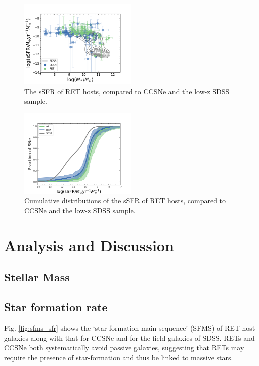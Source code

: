 \documentclass[fleqn,usenatbib,]{mnras}
\begin{document}
\begin{figure}
\includegraphics[width=0.5\textwidth]{figs/sSFR_Mike.png}
\caption{The sSFR of RET hosts, compared to CCSNe and the low-z SDSS sample.
\label{fig:sfms_ssfr}}
\end{figure}

\begin{figure}
\includegraphics[width=0.5\textwidth]{figs/cum_sSFR_mike.png}
\caption{Cumulative distributions of the sSFR of RET hosts, compared to CCSNe and the low-z SDSS sample.
\label{fig:ssfr_cum}}
\end{figure}


\section{Analysis and Discussion}
\label{sec:analysis} %



\subsection{Stellar Mass \label{subsec:res_mass}}

\subsection{Star formation rate \label{subsec:res_sfr}}
Fig. \ref{fig:sfms_sfr} shows the `star formation main sequence' (SFMS) of RET host galaxies along with that for CCSNe and for the field galaxies of SDSS. RETs and CCSNe both systematically avoid passive galaxies, suggesting that RETs may require the presence of star-formation and thus be linked to massive stars.
\end{document}
